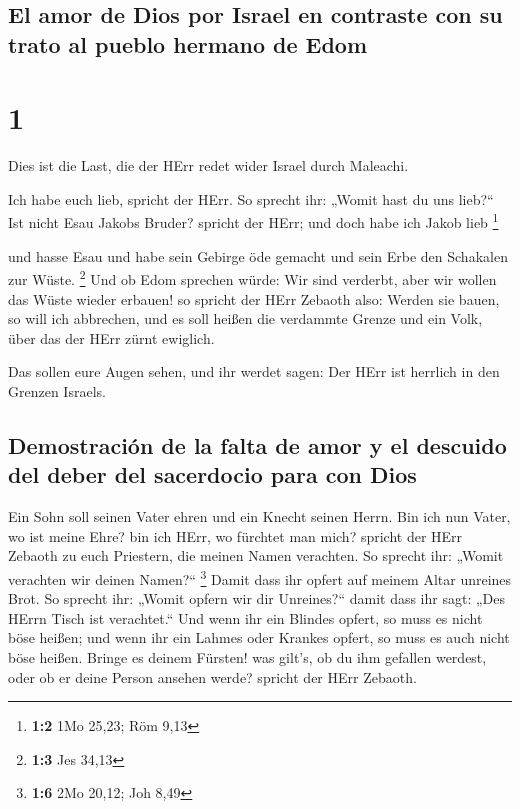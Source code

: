 \hypertarget{el-amor-de-dios-por-israel-en-contraste-con-su-trato-al-pueblo-hermano-de-edom}{%
\subsection{El amor de Dios por Israel en contraste con su trato al
pueblo hermano de
Edom}\label{el-amor-de-dios-por-israel-en-contraste-con-su-trato-al-pueblo-hermano-de-edom}}

\hypertarget{section}{%
\section{1}\label{section}}

 Dies ist die Last, die der HErr redet wider Israel durch
Maleachi.

 Ich habe euch lieb, spricht der HErr. So sprecht ihr:
„Womit hast du uns lieb?{}`` Ist nicht Esau Jakobs Bruder? spricht der
HErr; und doch habe ich Jakob lieb \footnote{\textbf{1:2} 1Mo 25,23; Röm
  9,13}

 und hasse Esau und habe sein Gebirge öde gemacht und sein
Erbe den Schakalen zur Wüste. \footnote{\textbf{1:3} Jes 34,13}
 Und ob Edom sprechen würde: Wir sind verderbt, aber wir
wollen das Wüste wieder erbauen! so spricht der HErr Zebaoth also:
Werden sie bauen, so will ich abbrechen, und es soll heißen die
verdammte Grenze und ein Volk, über das der HErr zürnt ewiglich.

 Das sollen eure Augen sehen, und ihr werdet sagen: Der
HErr ist herrlich in den Grenzen Israels.

\hypertarget{demostraciuxf3n-de-la-falta-de-amor-y-el-descuido-del-deber-del-sacerdocio-para-con-dios}{%
\subsection{Demostración de la falta de amor y el descuido del deber del
sacerdocio para con
Dios}\label{demostraciuxf3n-de-la-falta-de-amor-y-el-descuido-del-deber-del-sacerdocio-para-con-dios}}

 Ein Sohn soll seinen Vater ehren und ein Knecht seinen
Herrn. Bin ich nun Vater, wo ist meine Ehre? bin ich HErr, wo fürchtet
man mich? spricht der HErr Zebaoth zu euch Priestern, die meinen Namen
verachten. So sprecht ihr: „Womit verachten wir deinen Namen?{}``
\footnote{\textbf{1:6} 2Mo 20,12; Joh 8,49}  Damit dass
ihr opfert auf meinem Altar unreines Brot. So sprecht ihr: „Womit opfern
wir dir Unreines?{}`` damit dass ihr sagt: „Des HErrn Tisch ist
verachtet.``  Und wenn ihr ein Blindes opfert, so muss es
nicht böse heißen; und wenn ihr ein Lahmes oder Krankes opfert, so muss
es auch nicht böse heißen. Bringe es deinem Fürsten! was gilt's, ob du
ihm gefallen werdest, oder ob er deine Person ansehen werde? spricht der
HErr Zebaoth.

